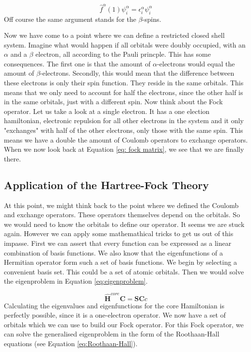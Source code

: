 \begin{equation}\label{eq:spinelim}
    \hat{f}^{\alpha}(1)\psi^{\alpha}_i = \epsilon^{\alpha}_i\psi^{\alpha}_i
\end{equation}
Off course the same argument stands for the $\beta$-spins.

Now we have come to a point where we can define a restricted closed shell system.
Imagine what would happen if all orbitals were doubly occupied, with an $\alpha$
and a $\beta$ electron, all according to the Pauli princple. This has some consequences.
The first one is that the amount of $\alpha$-electrons would equal the amount of
$\beta$-electrons. Secondly, this would mean that the difference between these electrons
is only their spin function. They reside in the same orbitals. This means that we only
need to account for half the electrons, since the other half is in the same orbitals,
just with a different spin. Now think about the Fock operator. Let us
take a look at a single electron. It has a one election hamiltonian, electronic repulsion
for all other electrons in the system and it only "exchanges" with half of the other
electrons, only those with the same spin. This means we have a double the amount of 
Coulomb operators to exchange operators. When we now look back at Equation \ref{eq: fock matrix},
we see that we are finally there.

\subsection{Application of the Hartree-Fock Theory}
\label{subsec:applic}
At this point, we might think back to the point where we defined the Coulomb and
exchange operators. These operators themselves depend on the orbitals. So we would
need to know the orbitals to define our operator. It seems we are stuck again.
However we can apply some mathemathical tricks to get us out of this impasse. 
First we can assert that every function can be expressed as a linear combination
of basis functions. We also know that the eigenfunctions of a Hermitian operator
form such a set of basis functions. We begin by selecting a convenient basis set.
This could be a set of atomic orbitals. Then we would solve the eigenproblem in
Equation \ref{eq:eigenproblem}.

\begin{equation}\label{eq:eigenproblem}
    \boldsymbol{\hat{H}}^{core}\boldsymbol{C} = \boldsymbol{SC}c
\end{equation} 
Calculating the eigenvalues and eigenfunctions for the core Hamiltonian is 
perfectly possible, since it is a one-electron operator. We now have a set of 
orbitals which we can use to build our Fock operator. For this Fock operator, 
we can solve the generalised eigenproblem in the form of the Roothaan-Hall 
equations (see Equation \ref{eq:Roothaan-Hall}).

